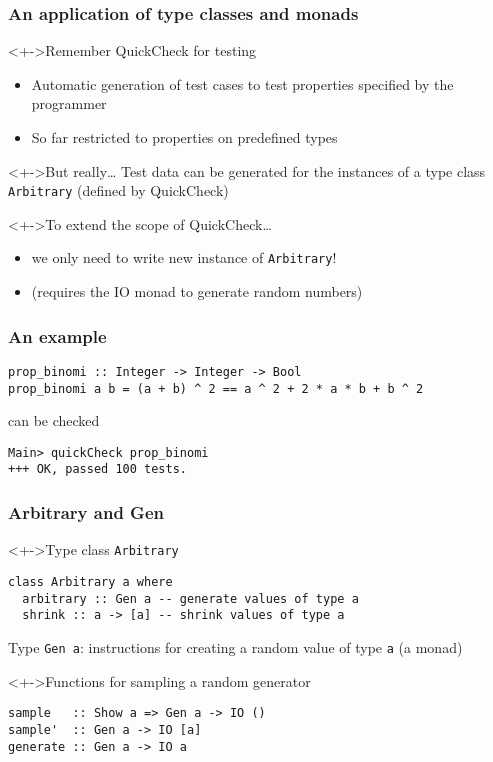 \documentclass{beamer}
\subtitle{Test data generators}
\begin{document}
\begin{frame}
  \titlepage
\end{frame}
\begin{frame}[fragile]
  \frametitle{An application of type classes and monads}
  \begin{block}<+->{Remember QuickCheck for testing}
    \begin{itemize}
    \item Automatic generation of test cases to test properties specified by the programmer
    \item So far restricted to properties on predefined types
    \end{itemize}
  \end{block}
  \begin{block}<+->{But really\dots}
    Test data can be generated for the instances of a type class \texttt{Arbitrary} (defined by QuickCheck) 
  \end{block}
  \begin{block}<+->{To extend the scope of QuickCheck\dots}
    \begin{itemize}
    \item we only need to write new instance of \texttt{Arbitrary}!
    \item (requires the IO monad to generate random numbers)
    \end{itemize}
  \end{block}
\end{frame}
\begin{frame}[fragile]
  \frametitle{An example}
\begin{verbatim}
prop_binomi :: Integer -> Integer -> Bool
prop_binomi a b = (a + b) ^ 2 == a ^ 2 + 2 * a * b + b ^ 2
\end{verbatim}
  can be checked
\begin{verbatim}
Main> quickCheck prop_binomi
+++ OK, passed 100 tests.
\end{verbatim}
\end{frame}
\begin{frame}[fragile]
  \frametitle{Arbitrary and Gen}
  \begin{block}<+->{Type class \texttt{Arbitrary}}
\begin{verbatim}
class Arbitrary a where
  arbitrary :: Gen a -- generate values of type a
  shrink :: a -> [a] -- shrink values of type a
\end{verbatim}
    Type \texttt{Gen a}: instructions for creating a random value of type \texttt{a} (a monad)
  \end{block}
  \begin{block}<+->{Functions for sampling a random generator}
\begin{verbatim}
sample   :: Show a => Gen a -> IO ()
sample'  :: Gen a -> IO [a]
generate :: Gen a -> IO a
\end{verbatim}
  \end{block}
\end{frame}
\end{document}
